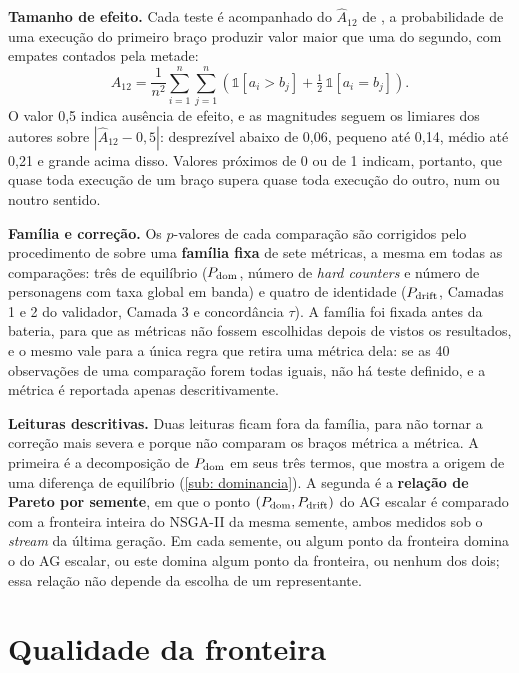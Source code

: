 \textbf{Tamanho de efeito.} Cada teste é acompanhado do $\hat{A}_{12}$ de , a probabilidade de uma execução do primeiro braço produzir valor maior que uma do segundo, com empates contados pela metade:
\begin{equation}
    \label{eq: a12}
    \hat{A}_{12} = \frac{1}{n^2} \sum_{i=1}^{n} \sum_{j=1}^{n} \left( \mathbb{1}[a_i > b_j] + \tfrac{1}{2}\, \mathbb{1}[a_i = b_j] \right).
\end{equation}
O valor 0,5 indica ausência de efeito, e as magnitudes seguem os limiares dos autores sobre $|\hat{A}_{12} - 0{,}5|$: desprezível abaixo de 0,06, pequeno até 0,14, médio até 0,21 e grande acima disso. Valores próximos de 0 ou de 1 indicam, portanto, que quase toda execução de um braço supera quase toda execução do outro, num ou noutro sentido.

\textbf{Família e correção.} Os $p$-valores de cada comparação são corrigidos pelo procedimento de  sobre uma \textbf{família fixa} de sete métricas, a mesma em todas as comparações: três de equilíbrio ($P_{\mathrm{dom}}$, número de \textit{hard counters} e número de personagens com taxa global em banda) e quatro de identidade ($P_{\mathrm{drift}}$, Camadas 1 e 2 do validador, Camada 3 e concordância $\tau$). A família foi fixada antes da bateria, para que as métricas não fossem escolhidas depois de vistos os resultados, e o mesmo vale para a única regra que retira uma métrica dela: se as 40 observações de uma comparação forem todas iguais, não há teste definido, e a métrica é reportada apenas descritivamente.

\textbf{Leituras descritivas.} Duas leituras ficam fora da família, para não tornar a correção mais severa e porque não comparam os braços métrica a métrica. A primeira é a decomposição de $P_{\mathrm{dom}}$ em seus três termos, que mostra a origem de uma diferença de equilíbrio (\autoref{sub: dominancia}). A segunda é a \textbf{relação de Pareto por semente}, em que o ponto $(P_{\mathrm{dom}}, P_{\mathrm{drift}})$ do AG escalar é comparado com a fronteira inteira do NSGA-II da mesma semente, ambos medidos sob o \textit{stream} da última geração. Em cada semente, ou algum ponto da fronteira domina o do AG escalar, ou este domina algum ponto da fronteira, ou nenhum dos dois; essa relação não depende da escolha de um representante.

\section{Qualidade da fronteira}
\label{sec: qualidade_fronteira}

